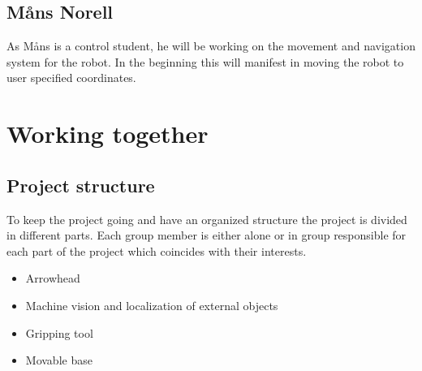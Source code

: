 \section*{Måns Norell}
As Måns is a control student, he will be working on the movement and navigation system for the robot. In the beginning this will manifest in moving the robot to user specified coordinates.

\chapter{Working together}
\section*{Project structure}
To keep the project going and have an organized structure the project is divided 
in different parts. Each group member is either alone or in group responsible for each part of the project which coincides with their interests. 
\begin{itemize}
    \item Arrowhead
    \item Machine vision and localization of external objects
    \item Gripping tool
    \item Movable base
\end{itemize}

